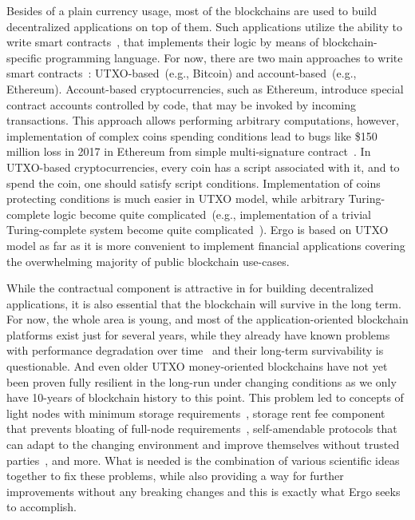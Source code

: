 Besides of a plain currency usage, most of the blockchains are used to build decentralized applications on top of them.
Such applications utilize the ability to write smart contracts~\cite{szabo1994smart}, that implements their logic
by means of blockchain-specific programming language.
For now, there are two main approaches to write smart contracts~\cite{zahnentferner2018chimeric}:
UTXO-based~(e.g., Bitcoin) and account-based~(e.g., Ethereum).
Account-based cryptocurrencies, such as Ethereum, introduce special contract accounts controlled by code,
that may be invoked by incoming transactions.
This approach allows performing arbitrary computations, however, implementation of complex coins spending conditions
lead to bugs like \$150 million loss in 2017 in
Ethereum from simple multi-signature contract~\cite{parityLock}.
In UTXO-based cryptocurrencies, every coin has a script associated with it, and to spend the coin, one should
satisfy script conditions.
Implementation of coins protecting conditions is much easier in UTXO model,
while arbitrary Turing-complete logic become quite complicated~(e.g., implementation of a trivial Turing-complete
system become quite complicated~\cite{chepurnoy2018self}).
Ergo is based on UTXO model as far as it is more convenient to implement financial applications covering the
overwhelming majority of public blockchain use-cases.

While the contractual component is attractive in for building decentralized applications,
it is also essential that the blockchain will survive in the long term.
For now, the whole area is young, and most of the application-oriented blockchain platforms exist just for several years,
while they already have known problems with performance degradation over time~\cite{???} and their long-term survivability is questionable.
And even older UTXO money-oriented blockchains have not yet been proven fully resilient in the long-run
under changing conditions as we only have 10-years of blockchain history to this point.
This problem led to concepts of light nodes with minimum storage requirements~\cite{reyzin2017improving},
storage rent fee component that prevents bloating of full-node requirements~\cite{chepurnoy2018systematic},
self-amendable protocols that can adapt to the changing environment and improve themselves without
trusted parties~\cite{goodman2014tezos}, and more.
What is needed is the combination of various scientific ideas together to fix these problems, while also
providing a way for further improvements without any breaking changes and this is exactly what Ergo seeks to accomplish.

